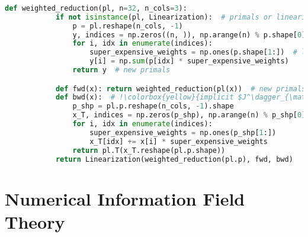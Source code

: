 \documentclass[aspectratio=169,xcolor=dvipsnames]{beamer}
\begin{document}
\begin{frame}[fragile]
	\frametitle{\insertsection}
	\framesubtitle{\insertsubsection}

	\vspace{-1em}
	\begin{lstlisting}[language=python,escapechar=!,basicstyle=\fontsize{8}{9}\selectfont\ttfamily]
		def weighted_reduction(pl, n=32, n_cols=3):
			if not isinstance(pl, Linearization):  # primals or linearization
				p = pl.reshape(n_cols, -1)
				y, indices = np.zeros((n, )), np.arange(n) % p.shape[0]
				for i, idx in enumerate(indices):
					super_expensive_weights = np.ones(p.shape[1:])  # large weights
					y[i] = np.sum(p[idx] * super_expensive_weights)
				return y  # new primals

			def fwd(x): return weighted_reduction(pl(x))  # new primals
			def bwd(x):  # !\colorbox{yellow}{implicit $J^\dagger_{\mathrm{wr},\mathrm{pl.p}}$ which re-computes all weights}!
				p_shp = pl.p.reshape(n_cols, -1).shape
				x_T, indices = np.zeros(p_shp), np.arange(n) % p_shp[0]
				for i, idx in enumerate(indices):
					super_expensive_weights = np.ones(p_shp[1:])
					x_T[idx] += x[i] * super_expensive_weights
				return pl.T(x_T.reshape(pl.p.shape))
			return Linearization(weighted_reduction(pl.p), fwd, bwd)
	\end{lstlisting}
\end{frame}

\section{Numerical Information Field Theory}  %


\end{document}
